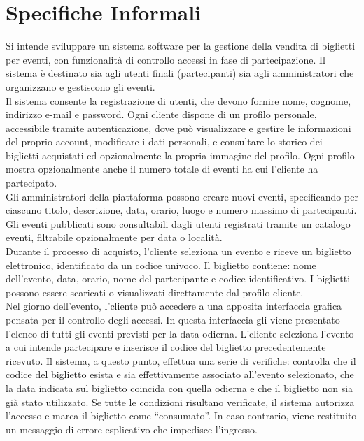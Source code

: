 \chapter{Specifiche Informali}
Si intende sviluppare un sistema software per la gestione della vendita di biglietti per eventi, con funzionalità di controllo accessi in fase di partecipazione. Il sistema è destinato sia agli utenti finali (partecipanti) sia agli amministratori che organizzano e gestiscono gli eventi.\\

\noindent Il sistema consente la registrazione di utenti, che devono fornire nome, cognome, indirizzo e-mail e password. Ogni cliente dispone di un profilo personale, accessibile tramite autenticazione, dove può visualizzare e gestire le informazioni del proprio account, modificare i dati personali, e consultare lo storico dei biglietti acquistati ed opzionalmente la propria immagine del profilo. Ogni profilo mostra opzionalmente anche il numero totale di eventi ha cui l’cliente ha partecipato.\\

\noindent Gli amministratori della piattaforma possono creare nuovi eventi, specificando per ciascuno titolo, descrizione, data, orario, luogo e numero massimo di partecipanti. Gli eventi pubblicati sono consultabili dagli utenti registrati tramite un catalogo eventi, filtrabile opzionalmente per data o località.\\

\noindent Durante il processo di acquisto, l’cliente seleziona un evento e riceve un biglietto elettronico, identificato da un codice univoco. Il biglietto contiene: nome dell’evento, data, orario, nome del partecipante e codice identificativo. I biglietti possono essere scaricati o visualizzati direttamente dal profilo cliente.\\

\noindent Nel giorno dell’evento, l’cliente può accedere a una apposita interfaccia grafica pensata per il controllo degli accessi. In questa interfaccia gli viene presentato l’elenco di tutti gli eventi previsti per la data odierna. L’cliente seleziona l’evento a cui intende partecipare e inserisce il codice del biglietto precedentemente ricevuto. Il sistema, a questo punto, effettua una serie di verifiche: controlla che il codice del biglietto esista e sia effettivamente associato all’evento selezionato, che la data indicata sul biglietto coincida con quella odierna e che il biglietto non sia già stato utilizzato. Se tutte le condizioni risultano verificate, il sistema autorizza l’accesso e marca il biglietto come “consumato”. In caso contrario, viene restituito un messaggio di errore esplicativo che impedisce l’ingresso.\\

